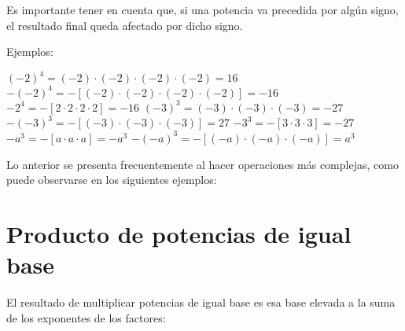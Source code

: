 \noindent{}



Es importante tener en cuenta que, si una potencia va precedida por
algún signo, el resultado final queda afectado por dicho signo.  

Ejemplos:

\begin{ejemplos}[1][\textbullet]
  \task $(-2)^4 = (-2)\cdot(-2)\cdot(-2)\cdot(-2) = 16$
  \task $-(-2)^4 = -[(-2)\cdot(-2)\cdot(-2)\cdot(-2)] = -16$
  \task $-2^4 = -[2 \cdot 2 \cdot 2 \cdot 2] = -16$
  \task $(-3)^3 = (-3)\cdot(-3)\cdot(-3) = -27$
  \task $-(-3)^3 = -[(-3)\cdot(-3)\cdot(-3)] = 27$
  \task $-3^3 = -[3 \cdot 3 \cdot 3] = -27$
  \task $-a^3 = -[a \cdot a \cdot a] = -a^3$
  \task $-(-a)^3 = -[(-a)\cdot(-a)\cdot(-a)] = a^3$
\end{ejemplos}




Lo anterior se presenta frecuentemente al hacer operaciones más complejas, como puede observarse en los siguientes ejemplos:










\section*{Producto de potencias de igual base}

El resultado de multiplicar potencias de igual base es esa base elevada a la suma de los exponentes de los factores:



